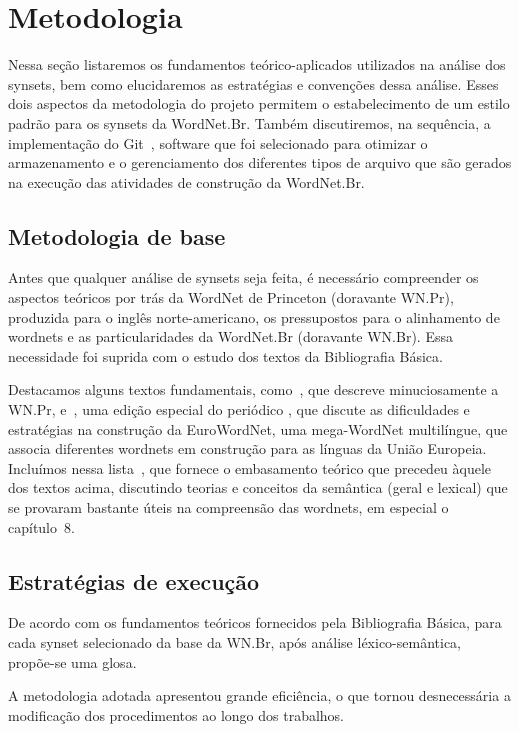\chapter{Metodologia}

Nessa seção listaremos os fundamentos teórico-aplicados utilizados na análise
dos synsets, bem como elucidaremos as estratégias e convenções dessa análise.
Esses dois aspectos da metodologia do projeto permitem o estabelecimento de um
estilo padrão para os synsets da WordNet.Br. Também discutiremos, na sequência,
a implementação do Git~\cite{git}, software que foi selecionado para otimizar o
armazenamento e o gerenciamento dos diferentes tipos de arquivo que são gerados
na execução das atividades de construção da WordNet.Br.

\section{Metodologia de base}

Antes que qualquer análise de synsets seja feita, é necessário compreender os
aspectos teóricos por trás da WordNet de Princeton (doravante WN.Pr), produzida
para o inglês norte-americano, os pressupostos para o alinhamento de wordnets e
as particularidades da WordNet.Br (doravante WN.Br). Essa necessidade foi
suprida com o estudo dos textos da Bibliografia Básica.

Destacamos alguns textos fundamentais, como~, que descreve
minuciosamente a WN.Pr, e~, uma edição especial do periódico
, que discute as dificuldades e
estratégias na construção da EuroWordNet, uma mega-WordNet multilíngue, que
associa diferentes wordnets em construção para as línguas da União Europeia.
Incluímos nessa lista~, que fornece o embasamento teórico
que precedeu àquele dos textos acima, discutindo teorias e conceitos da
semântica (geral e lexical) que se provaram bastante úteis na compreensão das
wordnets, em especial o capítulo~8.

\section{Estratégias de execução}

De acordo com os fundamentos teóricos fornecidos pela Bibliografia Básica, para
cada synset selecionado da base da WN.Br, após análise léxico-semântica,
propõe-se uma glosa.

A metodologia adotada apresentou grande eficiência, o que tornou desnecessária a
modificação dos procedimentos ao longo dos trabalhos.

